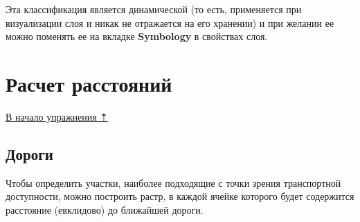 \documentclass[]{book}
\theoremstyle{definition}
\theoremstyle{definition}
\theoremstyle{definition}
\theoremstyle{remark}
\begin{document}
Эта классификация является динамической (то есть, применяется при
визуализации слоя и никак не отражается на его хранении) и при желании
ее можно поменять ее на вкладке \textbf{Symbology} в свойствах слоя.

\hypertarget{weighted-overlay-distances}{%
\section{Расчет расстояний}\label{weighted-overlay-distances}}

\protect\hyperlink{weighted-overlay}{В начало упражнения ⇡}

\hypertarget{weighted-overlay-roads}{%
\subsection{Дороги}\label{weighted-overlay-roads}}

Чтобы определить участки, наиболее подходящие с точки зрения
транспортной доступности, можно построить растр, в каждой ячейке
которого будет содержится расстояние (евклидово) до ближайшей дороги.
\end{document}
